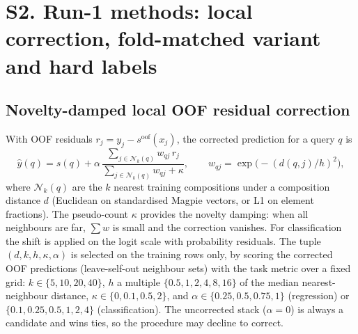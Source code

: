 \section*{S2. Run-1 methods: local correction, fold-matched variant and hard labels}
\subsection{Novelty-damped local OOF residual correction}
\label{sec:naive}
With OOF residuals $r_j = y_j - s^{\mathrm{oof}}(x_j)$, the corrected prediction for a query $q$ is
\begin{equation}
\hat y(q) = s(q) + \alpha\,\frac{\sum_{j\in\mathcal N_k(q)} w_{qj}\,r_j}{\sum_{j\in\mathcal N_k(q)} w_{qj} + \kappa},
\qquad w_{qj}=\exp\!\big(-(d(q,j)/h)^2\big),
\label{eq:naive}
\end{equation}
where $\mathcal N_k(q)$ are the $k$ nearest training compositions under a composition distance $d$ (Euclidean on standardised Magpie vectors, or L1 on element fractions).
The pseudo-count $\kappa$ provides the novelty damping: when all neighbours are far, $\sum w$ is small and the correction vanishes.
For classification the shift is applied on the logit scale with probability residuals.
The tuple $(d,k,h,\kappa,\alpha)$ is selected on the training rows only, by scoring the corrected OOF predictions (leave-self-out neighbour sets) with the task metric over a fixed grid: $k\in\{5,10,20,40\}$, $h$ a multiple $\{0.5,1,2,4,8,16\}$ of the median nearest-neighbour distance, $\kappa\in\{0,0.1,0.5,2\}$, and $\alpha\in\{0.25,0.5,0.75,1\}$ (regression) or $\{0.1,0.25,0.5,1,2,4\}$ (classification).
The uncorrected stack ($\alpha=0$) is always a candidate and wins ties, so the procedure may decline to correct.


